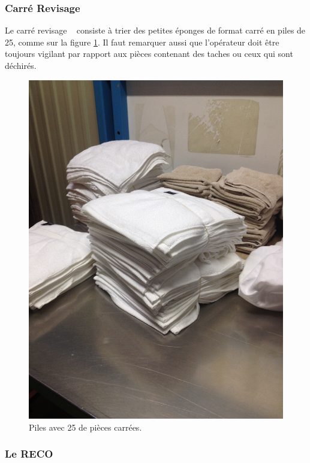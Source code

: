 \documentclass{article}
\newcommand{\rapportFigure}{0.075}
\begin{document}
\subsubsection{Carré Revisage}

Le \og carré revisage \fg~ consiste à trier des petites éponges de
format carré en piles de 25, comme sur la figure \ref{fig:carre}. Il faut
remarquer aussi que l'opérateur doit être toujours vigilant par rapport aux
pièces contenant des taches ou ceux qui sont déchirés.

\FloatBarrier

\begin{figure}[h]
    \centering \includegraphics[angle = -90, scale=
    \rapportFigure]{images/carre}
    \caption{Piles avec 25 de pièces carrées.}
    \label{fig:carre}
\end{figure}
\FloatBarrier


\subsubsection{Le RECO}
\end{document}
